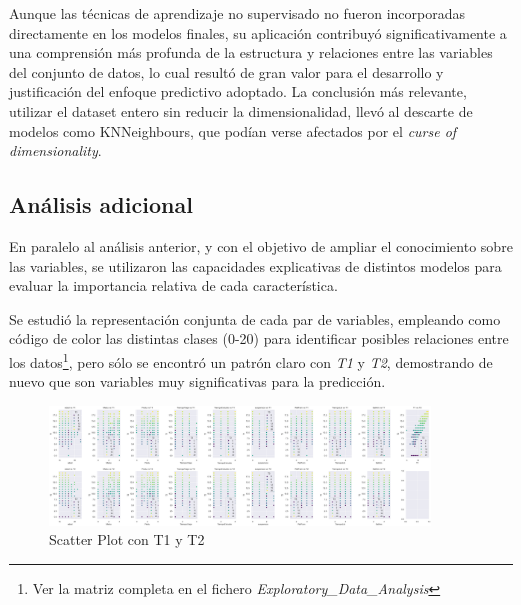 \documentclass{article}
\begin{document}
Aunque las técnicas de aprendizaje no supervisado no fueron incorporadas directamente en los modelos finales, su aplicación contribuyó significativamente a una comprensión más profunda de la estructura y relaciones entre las variables del conjunto de datos, lo cual resultó de gran valor para el desarrollo y justificación del enfoque predictivo adoptado.
La conclusión más relevante, utilizar el dataset entero sin reducir la dimensionalidad, llevó al descarte de modelos como KNNeighbours, que podían verse afectados por el \textit{curse of dimensionality}.

\subsection{Análisis adicional}


En paralelo al análisis anterior, y con el objetivo de ampliar el conocimiento sobre las variables, se utilizaron las capacidades explicativas de distintos modelos para evaluar la importancia relativa de cada característica.

Se estudió la representación conjunta de cada par de variables, empleando como código de color las distintas clases (0-20) para identificar posibles relaciones entre los datos\footnote{Ver la matriz completa en el fichero \textit{Exploratory\_Data\_Analysis}}, pero sólo se encontró un patrón claro con \textit{T1} y \textit{T2}, 
demostrando de nuevo que son variables muy significativas para la predicción.

\begin{figure}[ht]
  \centering
  \includegraphics[width=0.9\textwidth]{Plot_Var_T1T2.png}
  \caption{Scatter Plot con T1 y T2}\label{fig:scatter}
\end{figure}
\end{document}
